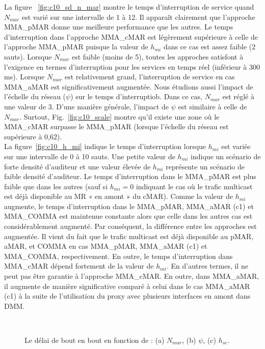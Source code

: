 La figure ~\ref{fig:c10_sd_n_mar} montre le temps d'interruption de service quand $ N_{mar} $ est varié sur une intervalle de 1 à 12. Il apparaît clairement que l'approche MMA\_pMAR donne une meilleure performance que les autres. Le temps d'interruption dans l'approche MMA\_cMAR est légèrement supérieure à celle de l'approche MMA\_pMAR puisque la valeur de $ h_{mi} $ dans ce cas est assez faible (2 sauts). Lorsque $ N_{mar} $ est faible (moins de 5), toutes les approches satisfont à l'exigence en termes d'interruption pour les services en temps réel (inférieur à 300 ms). Lorsque $ N_{mar} $ est relativement grand, l'interruption de service en cas MMA\_aMAR est significativement augmentée. Nous étudions aussi l'impact de l'échelle du réseau ($\psi $) sur le temps d'interruptiob. Dans ce cas, $ N_{mar} $ est réglé à une valeur de 3. D'une manière générale, l'impact de $\psi $ est similaire à celle de $ N_{mar} $. Surtout, Fig.~\ref{fig:c10_scale} montre qu'il existe une zone où le MMA\_cMAR surpasse le MMA\_pMAR (lorsque l'échelle du réseau est supérieure à 0,62).\\


La figure~\ref{fig:c10_h_mi} indique le temps d'interruption lorsque $ h_{mi} $ est variée sur une intervalle de 0 à 10 sauts. Une petite valeur de $ h_{mi} $ indique un scénario de forte densité d'auditeur et une valeur élevée de $ h_{mi} $ représente un scénario de faible densité d'auditeur. Le temps d'interruption dans le MMA\_pMAR est plus faible que dans les autres (sauf si $ h_{mi} = 0 $ indiquant le cas où le trafic multicast est déjà disponible au MR « en amont » du cMAR). Comme la valeur de $ h_ {mi} $ augmente, le temps d'interruption dans le MMA\_pMAR, MMA\_aMAR (c1) et MMA\_COMMA est maintenue constante alors que celle dans les autres cas est considérablement augmenté. Par conséquent, la différence entre les approches est augmentée. Il vient du fait que le trafic multicast est déjà disponible au pMAR, aMAR, et COMMA en cas MMA\_pMAR, MMA\_aMAR (c1) et MMA\_COMMA, respectivement. En outre, le temps d'interruption dans MMA\_cMAR dépend fortement de la valeur de $ h_{mi} $. En d'autres termes, il ne peut pas être garantie à l'approche MMA\_cMAR. En outre, dans MMA\_aMAR, il augmente de manière significative comparé à celui dans le cas MMA\_aMAR (c1) à la suite de l'utilisation du proxy avec plusieurs interfaces en amont dans DMM.\\


\begin{figure}[h!]
\centering
{}
\,
\caption[Le délai de bout en bout.]{Le délai de bout en bout en fonction de : (a) $N_{mar}$, (b) $\psi$, (c) $h_{sc}$.}
\label{fig:c10_e2e}
\end{figure}

